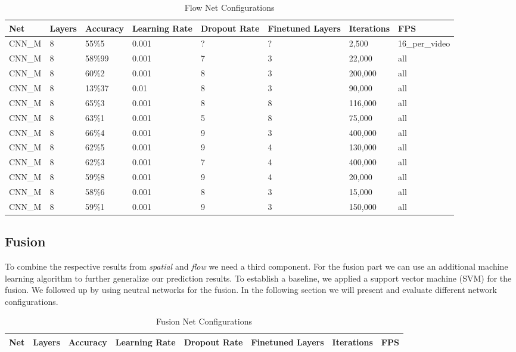 \begin{table}[H]
\centering
\caption{Flow Net Configurations}
\label{table:flow_results}
\begin{tabularx}{\textwidth}{XXXXXXXX}
\toprule
Net 		& Layers	& Accuracy	& Learning Rate 	& Dropout Rate	& Finetuned Layers	& Iterations	& FPS\\ \midrule

CNN\_M & 8 & 55\%5   & 0.001 & ? & ? & 2,500   & 16\_per\_video \\
CNN\_M & 8 & 58\%99  & 0.001 & 7 & 3 & 22,000  & all \\
CNN\_M & 8 & 60\%2   & 0.001 & 8 & 3 & 200,000 & all \\
CNN\_M & 8 & 13\%37  &  0.01 & 8 & 3 & 90,000  & all \\
CNN\_M & 8 & 65\%3   & 0.001 & 8 & 8 & 116,000 & all \\
CNN\_M & 8 & 63\%1   & 0.001 & 5 & 8 & 75,000  & all \\
CNN\_M & 8 & 66\%4   & 0.001 & 9 & 3 & 400,000 & all \\
CNN\_M & 8 & 62\%5   & 0.001 & 9 & 4 & 130,000 & all \\
CNN\_M & 8 & 62\%3   & 0.001 & 7 & 4 & 400,000 & all \\
CNN\_M & 8 & 59\%8   & 0.001 & 9 & 4 & 20,000  & all \\
CNN\_M & 8 & 58\%6   & 0.001 & 8 & 3 & 15,000  & all \\
CNN\_M & 8 & 59\%1   & 0.001 & 9 & 3 & 150,000 & all \\

\bottomrule
\end{tabularx}
\end{table}

\subsection{Fusion}
\label{subsec:fusion}

To combine the respective results from \emph{spatial} and \emph{flow} we need a third component.
For the fusion part we can use an additional machine learning algorithm to further generalize our prediction results.
To establish a baseline, we applied a support vector machine (SVM) for the fusion.
We followed up by using neutral networks for the fusion.
In the following section we will present and evaluate different network configurations.


\begin{table}[H]
\centering
\caption{Fusion Net Configurations}
\label{table:fusion_results}
\begin{tabularx}{\textwidth}{XXXXXXXX}
\toprule
Net 		& Layers	& Accuracy	& Learning Rate 	& Dropout Rate	& Finetuned Layers	& Iterations	& FPS\\ \midrule


\bottomrule
\end{tabularx}
\end{table}


